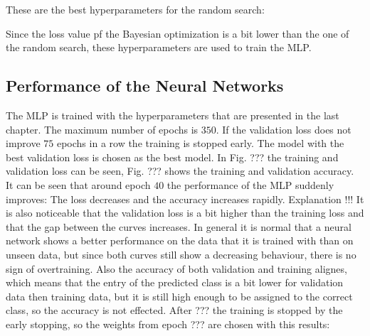 
These are the best hyperparameters for the random search:


Since the loss value pf the Bayesian optimization is a bit lower than the one of the random search, these hyperparameters are used to train the MLP.

\subsection{Performance of the Neural Networks}
\label{subsec:perfgat}

The MLP is trained with the hyperparameters that are presented in the last chapter. The maximum number of epochs is $350$. If the validation loss does not improve $75$ epochs in a row the 
training is stopped early. The model with the best validation loss is chosen as the best model. In Fig. ??? the training and validation loss can be seen, Fig. ??? shows the training and validation accuracy. It can be seen that around epoch $40$ the performance
of the MLP suddenly improves: The loss decreases and the accuracy increases rapidly. Explanation !!!
It is also noticeable that the validation loss is a bit higher than the training loss and that the gap between the curves increases. In general it is normal that a neural network shows a better performance
on the data that it is trained with than on unseen data, but since both curves still show a decreasing behaviour, there is no sign of overtraining. Also the accuracy of both validation and training alignes,
which means that the entry of the predicted class is a bit lower for validation data then training data, but it is still high enough to be assigned to the correct class, so the accuracy is not effected.
After ??? the training is stopped by the early stopping, so the weights from epoch ??? are chosen with this results:

